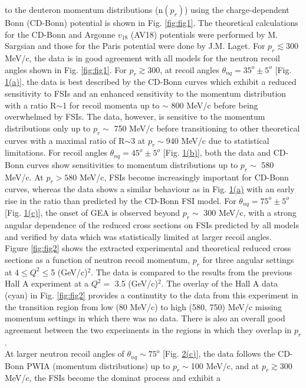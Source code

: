 to the deuteron momentum distributions (n$(p_{r})$) using the charge-dependent Bonn (CD-Bonn) potential is shown in Fig. \ref{fig:fig1}. The theoretical calculations for the
CD-Bonn and Argonne $v_{18}$ (AV18) potentials were performed by M. Sargsian and those for the Paris potential were done by J.M. Laget. For $p_{r}\lesssim 300$ MeV/c, the data is
in good agreement with all models for the neutron recoil angles shown in Fig. \ref{fig:fig1}. For $p_{r}\gtrsim 300$, at recoil angles $\theta_{nq} = 35^{o}\pm5^{o}$ [Fig. \hyperref[fig:fig1]{1(a)}],
the data is best described by the CD-Bonn curves which exhibit a reduced sensitivity to FSIs and an enhanced sensitivity to the momentum distribution with a ratio R$\sim$1 for recoil momenta
up to $\sim$ 800 MeV/c before being overwhelmed by FSIs. The data, however, is sensitive to the momentum distributions only up to $p_{r}\sim$ 750 MeV/c before transitioning to other theoretical curves
with a maximal ratio of R$\sim$3 at $p_{r}\sim$940 MeV/c due to statistical limitations. For recoil angles $\theta_{nq} = 45^{o}\pm5^{o}$ [Fig. \hyperref[fig:fig1]{1(b)}], both the data and
CD-Bonn curves show sensitivities to momentum distributions up to $p_{r}\sim$ 580 MeV/c. At $p_{r}>580$ MeV/c, FSIs become increasingly important for CD-Bonn curves, whereas the data shows
a similar behaviour as in Fig. \hyperref[fig:fig1]{1(a)} with an early rise in the ratio than predicted by the CD-Bonn FSI model. For $\theta_{nq} = 75^{o}\pm5^{o}$ [Fig. \hyperref[fig:fig1]{1(c)}], the
onset of GEA is observed beyond $p_{r}\sim$ 300 MeV/c, with a strong angular dependence of the reduced cross sections on FSIs predicted by all models and verified by data which was statistically limited
at larger recoil angles. \\
\indent Figure \ref{fig:fig2} shows the extracted experimental and theoretical reduced cross sections as a function of neutron recoil momentum, $p_{r}$ for three angular settings at 4$\leq Q^{2} \leq$5
(GeV/c)$^{2}$. The data is compared to the results from the previous Hall A experiment\cite{PhysRevLett.107.262501} at a $Q^{2}=$ 3.5 (GeV/c)$^{2}$.  The overlay of the Hall A data (cyan) in Fig. \ref{fig:fig2}
provides a continutity to the data from this experiment in the transition region from low (80 MeV/c) to high (580, 750) MeV/c missing momentum settings in which there was no data. There is also an overall good agreement between the two experiments
in the regions in which they overlap in $p_{r}$. \\
\indent At larger neutron recoil angles of $\theta_{nq}\sim75^{o}$ [Fig. \hyperref[fig:fig2]{2(c)}], the data follows the CD-Bonn PWIA (momentum distributions) up to $p_{r}\sim $100 MeV/c, and at $p_{r}\gtrsim$300 MeV/c, the FSIs become the dominat process and exhibit a
